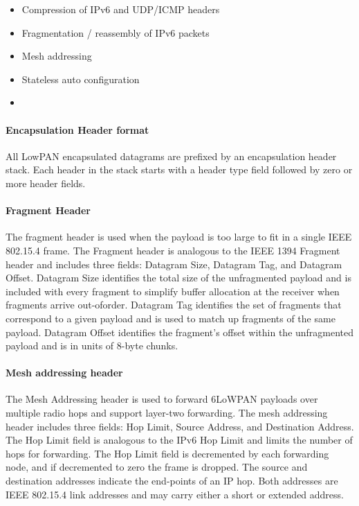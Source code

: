 	\begin{itemize}
		\item Compression of IPv6 and UDP/ICMP headers
		\item Fragmentation / reassembly of IPv6 packets
		\item Mesh addressing
		\item Stateless auto configuration
		\item 
	\end{itemize}
	
\paragraph{Encapsulation Header format}
All LowPAN encapsulated datagrams are prefixed by an encapsulation header stack.
Each header in the stack starts with a header type field followed by zero or more header fields.

\paragraph{Fragment Header}
The fragment header is used when the payload is too large to fit in a single IEEE 802.15.4 frame.
The Fragment header is analogous to the IEEE 1394 Fragment header and includes three fields:
	Datagram Size,
	Datagram Tag,
	and Datagram Offset.
Datagram Size identifies the total size of the unfragmented payload and is included with every fragment to simplify buffer allocation at the receiver when fragments arrive out-oforder.
Datagram Tag identifies the set of fragments that correspond to a given payload and is used to match up fragments of the same payload.
Datagram Offset identifies the fragment’s offset within the unfragmented payload and is in units of 8-byte chunks.

\paragraph{Mesh addressing header}

The Mesh Addressing header is used to forward 6LoWPAN payloads over multiple radio hops and support layer-two forwarding.
The mesh addressing header includes three fields:
	Hop Limit,
	Source Address,
	and Destination Address.
The Hop Limit field is analogous to the IPv6 Hop Limit and limits the number of hops for forwarding.
The Hop Limit field is decremented by each forwarding node,
	and if decremented to zero the frame is dropped.
The source and destination addresses indicate the end-points of an IP hop.
Both addresses are IEEE 802.15.4 link addresses and may carry either a short or extended address.

